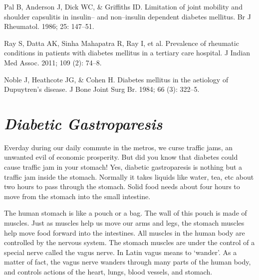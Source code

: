 {\begin{thebibliography}{99}
  Pal B, Anderson J, Dick WC, \& Griffiths ID. Limitation of joint mobility and shoulder capsulitis in insulin– and non–insulin dependent diabetes mellitus. Br J Rheumatol. 1986; 25: 147–51.

  Ray S, Datta AK, Sinha Mahapatra R, Ray I, et al. Prevalence of rheumatic conditions in patients with diabetes mellitus in a tertiary care hospital. J Indian Med Assoc. 2011; 109 (2): 74–8.

  Noble J, Heathcote JG, \& Cohen H. Diabetes mellitus in the aetiology of Dupuytren’s disease. J Bone Joint Surg Br. 1984; 66 (3): 322–5.

 \end{thebibliography}


\chapter{\textit{Diabetic Gastroparesis}}\label{chap20}

Everday during our daily commute in the metros, we curse traffic jams, an unwanted evil of economic prosperity. But did you know that diabetes could cause traffic jam in your stomach! Yes, diabetic gastroparesis is nothing but a traffic jam inside the stomach. Normally it takes liquids like water, tea, etc about two hours to pass through the stomach. Solid food needs about four hours to move from the stomach into the small intestine.

The human stomach is like a pouch or a bag. The wall of this pouch is made of muscles. Just as muscles help us move our arms and legs, the stomach muscles help move food forward into the intestines. All muscles in the human body are controlled by the nervous system. The stomach muscles are under the control of a special nerve called the vagus nerve. In Latin vagus means to ‘wander’. As a matter of fact, the vagus nerve wanders through many parts of the human body, and controls actions of the heart, lungs, blood vessels, and stomach.

}
